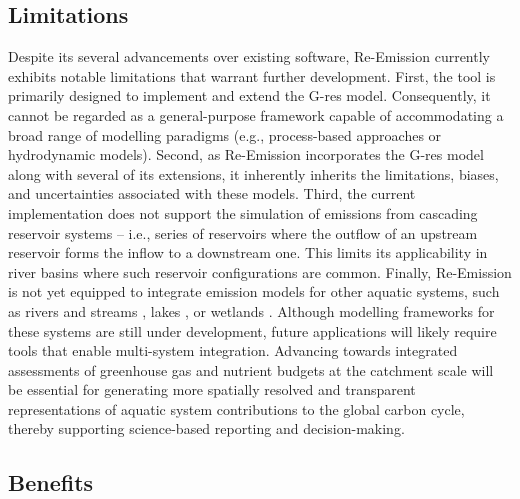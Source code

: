 \documentclass[final,1p,times]{elsarticle}
\begin{document}
\subsection{Limitations}
\label{subsec:limitations}

Despite its several advancements over existing software, Re-Emission currently exhibits notable limitations that warrant further development.
First, the tool is primarily designed to implement and extend the G-res model.
Consequently, it cannot be regarded as a general-purpose framework capable of accommodating a broad range of modelling paradigms (e.g., process-based approaches or hydrodynamic models).
Second, as Re-Emission incorporates the G-res model along with several of its extensions, it inherently inherits the limitations, biases, and uncertainties associated with these models.
Third, the current implementation does not support the simulation of emissions from cascading reservoir systems -- i.e., series of reservoirs where the outflow of an upstream reservoir forms the inflow to a downstream one.
This limits its applicability in river basins where such reservoir configurations are common.
Finally, Re-Emission is not yet equipped to integrate emission models for other aquatic systems, such as rivers and streams \citep{Rocher-Ros2023}, lakes \citep{Zhuang2023}, or wetlands \citep{Hu2024}.
Although modelling frameworks for these systems are still under development, future applications will likely require tools that enable multi-system integration.
Advancing towards integrated assessments of greenhouse gas and nutrient budgets at the catchment scale will be essential for generating more spatially resolved and transparent representations of aquatic system contributions to the global carbon cycle, thereby supporting science-based reporting and decision-making.

\subsection{Benefits}
\label{subsec:benefits}
\end{document}
